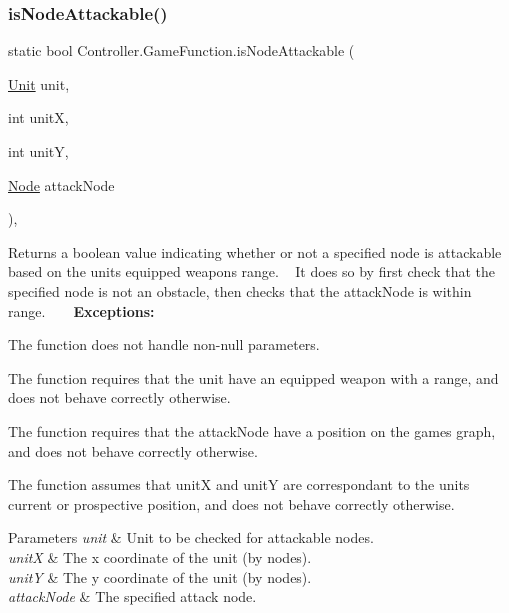 \subsubsection{\texorpdfstring{is\+Node\+Attackable()}{isNodeAttackable()}}
{\footnotesize\ttfamily static bool Controller.\+Game\+Function.\+is\+Node\+Attackable (\begin{DoxyParamCaption}\item[{\hyperlink{interface_model_1_1_unit_module_1_1_unit}{Unit}}]{unit,  }\item[{int}]{unitX,  }\item[{int}]{unitY,  }\item[{\hyperlink{class_model_1_1_map_module_1_1_node}{Node}}]{attack\+Node }\end{DoxyParamCaption})\hspace{0.3cm}{\ttfamily [inline]}, {\ttfamily [static]}}

Returns a boolean value indicating whether or not a specified node is attackable based on the unit\textquotesingle{}s equipped weapon\textquotesingle{}s range. ~\newline
 It does so by first check that the specified node is not an obstacle, then checks that the attack\+Node is within range. ~\newline
~\newline
 {\bfseries Exceptions\+:} ~\newline

\begin{DoxyItemize}
\item The function does not handle non-\/null parameters.
\item The function requires that the unit have an equipped weapon with a range, and does not behave correctly otherwise.
\item The function requires that the attack\+Node have a position on the game\textquotesingle{}s graph, and does not behave correctly otherwise.
\item The function assumes that unitX and unitY are correspondant to the unit\textquotesingle{}s current or prospective position, and does not behave correctly otherwise. 
\begin{DoxyParams}{Parameters}
{\em unit} & Unit to be checked for attackable nodes. \\
\hline
{\em unitX} & The x coordinate of the unit (by nodes). \\
\hline
{\em unitY} & The y coordinate of the unit (by nodes). \\
\hline
{\em attack\+Node} & The specified attack node. \\
\hline
\end{DoxyParams}

\end{DoxyItemize}\hypertarget{class_controller_1_1_game_function_ad685bf2e60bc063664f47ac2cc1fc385}{}\label{class_controller_1_1_game_function_ad685bf2e60bc063664f47ac2cc1fc385} 
